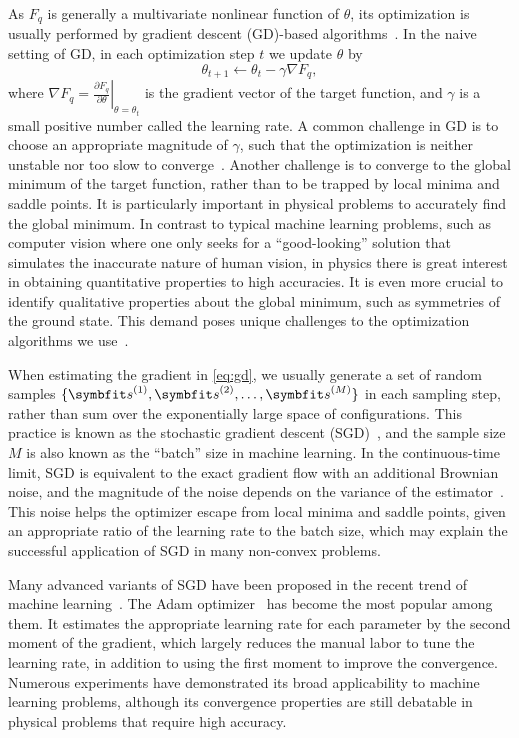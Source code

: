 As $F_q$ is generally a multivariate nonlinear function of $\theta$, its optimization is usually performed by gradient descent (GD)-based algorithms~\cite{curry1944method}. In the naive setting of GD, in each optimization step $t$ we update $\theta$ by
\begin{equation}
\theta_{t + 1} \gets \theta_t - \gamma \nabla F_q,
\label{eq:gd}
\end{equation}
where $\nabla F_q = \left.\frac{\partial F_q}{\partial \theta}\right|_{\theta = \theta_t}$ is the gradient vector of the target function, and $\gamma$ is a small positive number called the learning rate. A common challenge in GD is to choose an appropriate magnitude of $\gamma$, such that the optimization is neither unstable nor too slow to converge~\cite{boyd2004convex}. Another challenge is to converge to the global minimum of the target function, rather than to be trapped by local minima and saddle points. It is particularly important in physical problems to accurately find the global minimum. In contrast to typical machine learning problems, such as computer vision where one only seeks for a ``good-looking'' solution that simulates the inaccurate nature of human vision, in physics there is great interest in obtaining quantitative properties to high accuracies. It is even more crucial to identify qualitative properties about the global minimum, such as symmetries of the ground state. This demand poses unique challenges to the optimization algorithms we use~\cite{chen2023efficient, michaud2023precision}.

When estimating the gradient in \cref{eq:gd}, we usually generate a set of random samples $\{\vs^{(1)}, \vs^{(2)}, \ldots, \vs^{(M)}\}$ in each sampling step, rather than sum over the exponentially large space of configurations. This practice is known as the stochastic gradient descent (SGD)~\cite{robbins1951stochastic, bottou1998online}, and the sample size $M$ is also known as the ``batch'' size in machine learning. In the continuous-time limit, SGD is equivalent to the exact gradient flow with an additional Brownian noise, and the magnitude of the noise depends on the variance of the estimator~\cite{hu2017diffusion}. This noise helps the optimizer escape from local minima and saddle points, given an appropriate ratio of the learning rate to the batch size, which may explain the successful application of SGD in many non-convex problems.

Many advanced variants of SGD have been proposed in the recent trend of machine learning~\cite{kashyap2022survey}. The Adam optimizer~\cite{kingma2014adam} has become the most popular among them. It estimates the appropriate learning rate for each parameter by the second moment of the gradient, which largely reduces the manual labor to tune the learning rate, in addition to using the first moment to improve the convergence. Numerous experiments have demonstrated its broad applicability to machine learning problems, although its convergence properties are still debatable in physical problems that require high accuracy.

